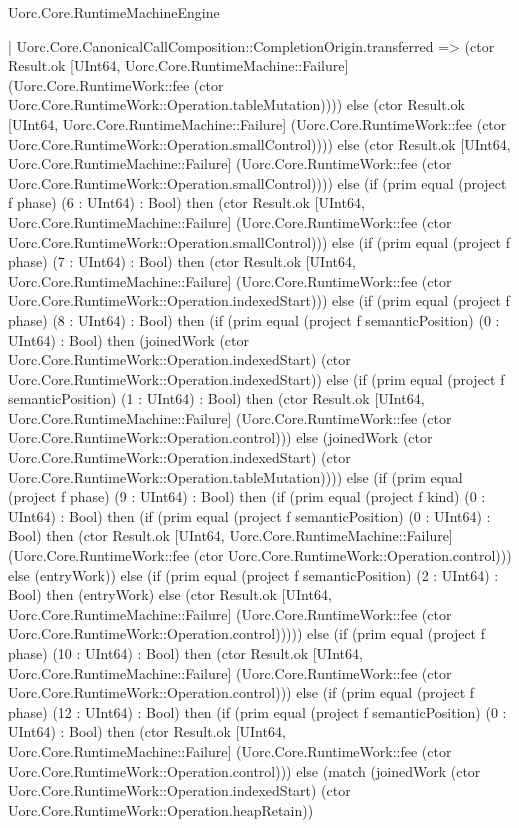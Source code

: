 \begin{lexlean}{Uorc.Core.RuntimeMachineEngine}
\begin{semanticmodule}
{      | Uorc.Core.CanonicalCallComposition::CompletionOrigin.transferred => (ctor Result.ok [UInt64, Uorc.Core.RuntimeMachine::Failure] (Uorc.Core.RuntimeWork::fee (ctor Uorc.Core.RuntimeWork::Operation.tableMutation)))) else (ctor Result.ok [UInt64, Uorc.Core.RuntimeMachine::Failure] (Uorc.Core.RuntimeWork::fee (ctor Uorc.Core.RuntimeWork::Operation.smallControl)))) else (ctor Result.ok [UInt64, Uorc.Core.RuntimeMachine::Failure] (Uorc.Core.RuntimeWork::fee (ctor Uorc.Core.RuntimeWork::Operation.smallControl)))) else (if (prim equal (project f phase) (6 : UInt64) : Bool) then (ctor Result.ok [UInt64, Uorc.Core.RuntimeMachine::Failure] (Uorc.Core.RuntimeWork::fee (ctor Uorc.Core.RuntimeWork::Operation.smallControl))) else (if (prim equal (project f phase) (7 : UInt64) : Bool) then (ctor Result.ok [UInt64, Uorc.Core.RuntimeMachine::Failure] (Uorc.Core.RuntimeWork::fee (ctor Uorc.Core.RuntimeWork::Operation.indexedStart))) else (if (prim equal (project f phase) (8 : UInt64) : Bool) then (if (prim equal (project f semanticPosition) (0 : UInt64) : Bool) then (joinedWork (ctor Uorc.Core.RuntimeWork::Operation.indexedStart) (ctor Uorc.Core.RuntimeWork::Operation.indexedStart)) else (if (prim equal (project f semanticPosition) (1 : UInt64) : Bool) then (ctor Result.ok [UInt64, Uorc.Core.RuntimeMachine::Failure] (Uorc.Core.RuntimeWork::fee (ctor Uorc.Core.RuntimeWork::Operation.control))) else (joinedWork (ctor Uorc.Core.RuntimeWork::Operation.indexedStart) (ctor Uorc.Core.RuntimeWork::Operation.tableMutation)))) else (if (prim equal (project f phase) (9 : UInt64) : Bool) then (if (prim equal (project f kind) (0 : UInt64) : Bool) then (if (prim equal (project f semanticPosition) (0 : UInt64) : Bool) then (ctor Result.ok [UInt64, Uorc.Core.RuntimeMachine::Failure] (Uorc.Core.RuntimeWork::fee (ctor Uorc.Core.RuntimeWork::Operation.control))) else (entryWork)) else (if (prim equal (project f semanticPosition) (2 : UInt64) : Bool) then (entryWork) else (ctor Result.ok [UInt64, Uorc.Core.RuntimeMachine::Failure] (Uorc.Core.RuntimeWork::fee (ctor Uorc.Core.RuntimeWork::Operation.control))))) else (if (prim equal (project f phase) (10 : UInt64) : Bool) then (ctor Result.ok [UInt64, Uorc.Core.RuntimeMachine::Failure] (Uorc.Core.RuntimeWork::fee (ctor Uorc.Core.RuntimeWork::Operation.control))) else (if (prim equal (project f phase) (12 : UInt64) : Bool) then (if (prim equal (project f semanticPosition) (0 : UInt64) : Bool) then (ctor Result.ok [UInt64, Uorc.Core.RuntimeMachine::Failure] (Uorc.Core.RuntimeWork::fee (ctor Uorc.Core.RuntimeWork::Operation.control))) else (match (joinedWork (ctor Uorc.Core.RuntimeWork::Operation.indexedStart) (ctor Uorc.Core.RuntimeWork::Operation.heapRetain))
}
\end{semanticmodule}
\end{lexlean}

